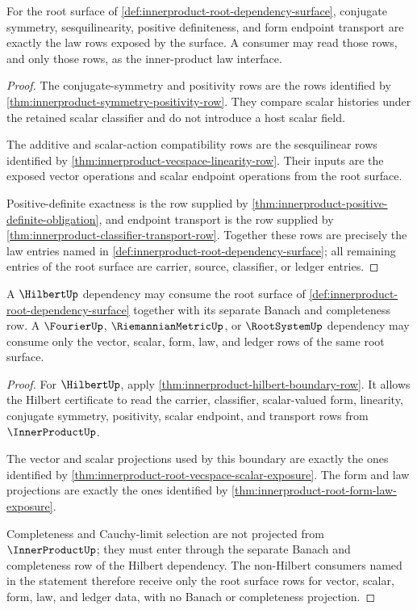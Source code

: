 \begin{theorem}
\label{thm:innerproduct-root-form-law-exposure}
For the root surface of \autoref{def:innerproduct-root-dependency-surface},
conjugate symmetry, sesquilinearity, positive definiteness, and form endpoint
transport are exactly the law rows exposed by the surface. A consumer may read
those rows, and only those rows, as the inner-product law interface.
\end{theorem}
\begin{proof}
The conjugate-symmetry and positivity rows are the rows identified by
\autoref{thm:innerproduct-symmetry-positivity-row}. They compare scalar
histories under the retained scalar classifier and do not introduce a host
scalar field.

The additive and scalar-action compatibility rows are the sesquilinear rows
identified by \autoref{thm:innerproduct-vecspace-linearity-row}. Their inputs
are the exposed vector operations and scalar endpoint operations from the root
surface.

Positive-definite exactness is the row supplied by
\autoref{thm:innerproduct-positive-definite-obligation}, and endpoint
transport is the row supplied by
\autoref{thm:innerproduct-classifier-transport-row}. Together these rows are
precisely the law entries named in
\autoref{def:innerproduct-root-dependency-surface}; all remaining entries of
the root surface are carrier, source, classifier, or ledger entries.
\end{proof}

\begin{theorem}
\label{thm:innerproduct-root-hilbert-consumption-surface}
A $\HilbertUp$ dependency may consume the root surface of
\autoref{def:innerproduct-root-dependency-surface} together with its separate
Banach and completeness row. A $\FourierUp$, $\RiemannianMetricUp$, or
$\RootSystemUp$ dependency may consume only the vector, scalar, form, law, and
ledger rows of the same root surface.
\end{theorem}
\begin{proof}
For $\HilbertUp$, apply \autoref{thm:innerproduct-hilbert-boundary-row}. It
allows the Hilbert certificate to read the carrier, classifier, scalar-valued
form, linearity, conjugate symmetry, positivity, scalar endpoint, and transport
rows from $\InnerProductUp$.

The vector and scalar projections used by this boundary are exactly the ones
identified by \autoref{thm:innerproduct-root-vecspace-scalar-exposure}. The
form and law projections are exactly the ones identified by
\autoref{thm:innerproduct-root-form-law-exposure}.

Completeness and Cauchy-limit selection are not projected from
$\InnerProductUp$; they must enter through the separate Banach and completeness
row of the Hilbert dependency. The non-Hilbert consumers named in the statement
therefore receive only the root surface rows for vector, scalar, form, law, and
ledger data, with no Banach or completeness projection.
\end{proof}
